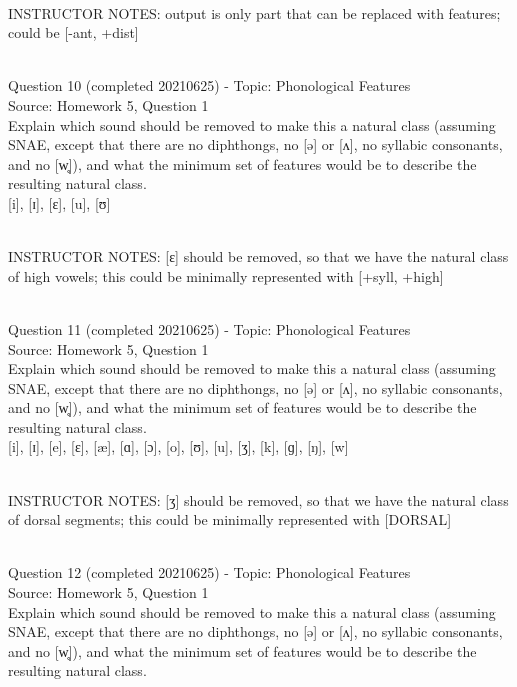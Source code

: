 \documentclass[12pt]{article}
\begin{document}
~\\
INSTRUCTOR NOTES: output is only part that can be replaced with features; could be [-ant, +dist]


~\\

{\large Question 10} (completed 20210625) - Topic: Phonological Features\\
Source: Homework 5, Question 1\\

Explain which sound should be removed to make this a natural class (assuming SNAE, except that there are no diphthongs, no [ə] or [ʌ], no syllabic consonants, and no [w̥]), and what the minimum set of features would be to describe the resulting natural class.\\

{[i]}, {[ɪ]}, {[ɛ]}, {[u]}, {[ʊ]}


~\\
INSTRUCTOR NOTES: [ɛ] should be removed, so that we have the natural class of high vowels; this could be minimally represented with [+syll, +high]


~\\

{\large Question 11} (completed 20210625) - Topic: Phonological Features\\
Source: Homework 5, Question 1\\

Explain which sound should be removed to make this a natural class (assuming SNAE, except that there are no diphthongs, no [ə] or [ʌ], no syllabic consonants, and no [w̥]), and what the minimum set of features would be to describe the resulting natural class.\\

{[i]}, {[ɪ]}, {[e]}, {[ɛ]}, {[æ]}, {[ɑ]}, {[ɔ]}, {[o]}, {[ʊ]}, {[u]}, {[ʒ]}, {[k]}, {[ɡ]}, {[ŋ]}, {[w]}


~\\
INSTRUCTOR NOTES: [ʒ] should be removed, so that we have the natural class of dorsal segments; this could be minimally represented with [DORSAL]


~\\

{\large Question 12} (completed 20210625) - Topic: Phonological Features\\
Source: Homework 5, Question 1\\

Explain which sound should be removed to make this a natural class (assuming SNAE, except that there are no diphthongs, no [ə] or [ʌ], no syllabic consonants, and no [w̥]), and what the minimum set of features would be to describe the resulting natural class.\\
\end{document}
